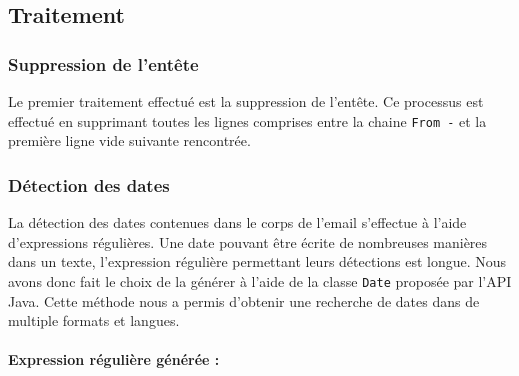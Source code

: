 \documentclass[a4paper,french,10pt]{article}
\begin{document}
\subsection{Traitement}

\subsubsection{Suppression de l'entête}
Le premier traitement effectué est la suppression de l'entête. Ce processus est effectué en supprimant toutes les lignes comprises entre la chaine \og \texttt{From -} \fg{} et la première ligne vide suivante rencontrée.

\subsubsection{Détection des dates}
La détection des dates contenues dans le corps de l'email s'effectue à l'aide d'expressions régulières. Une date pouvant être écrite de nombreuses manières dans un texte, l'expression régulière permettant leurs détections est longue. Nous avons donc fait le choix de la générer à l'aide de la classe \texttt{Date} proposée par l'API Java. Cette méthode nous a permis d'obtenir une recherche de dates dans de multiple formats et langues.

\paragraph*{Expression régulière générée :}
\end{document}
